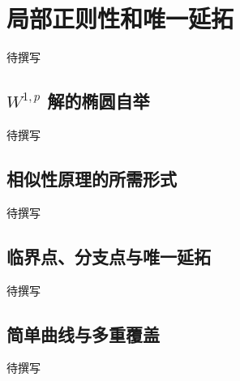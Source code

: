 
% 
% 

\section{局部正则性和唯一延拓}
\label{g4:sec:2202}

待撰写

\subsection{\texorpdfstring{\(W^{1,p}\) 解的椭圆自举}{W¹ᵖ 解的椭圆自举}}
\label{g4:subsec:2202:01}
待撰写

\subsection{相似性原理的所需形式}
\label{g4:subsec:2202:02}
待撰写

\subsection{临界点、分支点与唯一延拓}
\label{g4:subsec:2202:03}
待撰写

\subsection{简单曲线与多重覆盖}
\label{g4:subsec:2202:04}
待撰写
